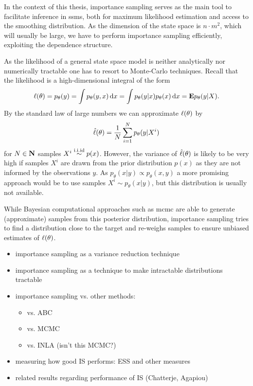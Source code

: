 
In the context of this thesis, importance sampling serves as the main tool to facilitate inference in \glspl{ssm}, both for maximum likelihood estimation and access to the smoothing distribution. As the dimension of the state space is $n\cdot m^{2}$, which will usually be large, we have to perform importance sampling efficiently, exploiting the dependence structure. 

As the likelihood of a general state space model is neither analytically nor numerically tractable one has to resort to Monte-Carlo techniques.
Recall that the likelihood is a high-dimensional integral of the form
\begin{align*}
    \ell(\theta) = p_\theta(y) = \int p_\theta(y,x) \,\mathrm d x = \int p_\theta(y|x) p_\theta(x) \,\mathrm d x = \mathbf E p_\theta(y|X).
\end{align*}
By the standard law of large numbers we can approximate $\ell(\theta)$ by
\begin{align*}
    \hat{\ell}(\theta) = \frac 1 N \sum_{i=1}^N p_\theta(y|X^i)
\end{align*}
for $N\in\mathbf N$ samples $X^i \stackrel{\text{i.i.id}}{\sim} p(x)$.
However, the variance of $\hat{\ell}(\theta)$ is likely to be very high if samples $X^i$ are drawn from the prior distribution $p(x)$ as they are not informed by the observations $y$.
As $p_\theta(x|y) \propto p_\theta(x,y)$ a more promising approach would be to use samples $X^i \sim p_\theta(x|y)$, but this distribution is usually not available.

While Bayesian computational approaches such as \gls{mcmc}\cite{Brooks2011Handbook} are able to generate (approximate) samples from this posterior distribution, importance sampling tries to find a distribution close to the target and re-weighs samples to ensure unbiased estimates of $\ell(\theta)$.

\begin{itemize}
    \item importance sampling as a variance reduction technique
    \item importance sampling as a technique to make intractable distributions tractable
    \item importance sampling vs. other methods:
          \begin{itemize}
              \item vs. ABC
              \item vs. MCMC
              \item vs. INLA (isn't this MCMC?)
          \end{itemize}
    \item measuring how good IS performs: ESS and other measures
    \item related results regarding performance of IS (Chatterje, Agapiou)
\end{itemize}

